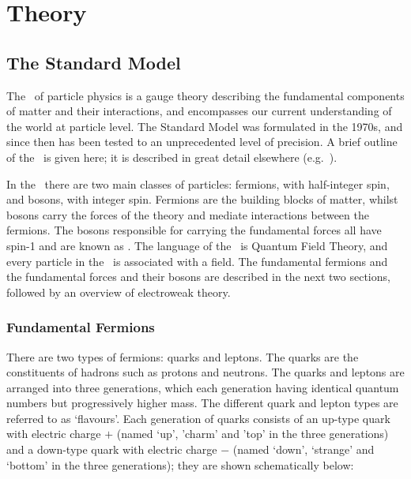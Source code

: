 \graphicspath{{Chapters/Theory/Figures/}}
\chapter{Theory}
\label{chap:Theory}

\section{The Standard Model}

The \sm\ of particle physics is a gauge theory describing the
fundamental components of matter and their interactions, and encompasses our
current understanding of the world at particle level. The Standard Model was
formulated in the 1970s, and since then has been tested to an unprecedented
level of precision. %
A brief outline of the \sm\ is given here; it is described in great detail
elsewhere (e.g.~\cite{ALTARELLI:2005zv}).

In the \sm\ there are two main classes of particles: fermions, with half-integer
spin, and bosons, with integer spin. Fermions are the building blocks of matter,
whilst bosons carry the forces of the theory and mediate interactions between the
fermions. The bosons responsible for carrying the fundamental forces all have
spin-1 and are known as .
The language of the \sm\ is Quantum Field Theory, and every particle in the \sm\
is associated with a field. The fundamental fermions and the fundamental forces
and their bosons are described in the next two sections, followed by an overview
of electroweak theory.

\subsection{Fundamental Fermions}

There are two types of fermions: quarks and leptons. The quarks are the
constituents of hadrons such as protons and neutrons. 
The quarks and leptons are arranged into three generations, which each
generation having identical quantum numbers but progressively higher mass. The
different quark and lepton types are referred to as `flavours'. Each
generation of quarks consists of an up-type quark with electric charge
$+$\nicefrac{2}{3}
(named `up', 'charm' and 'top' in the three generations) and a down-type quark
with electric charge $-$\nicefrac{1}{3} (named `down', `strange' and `bottom' in the three
generations); they are shown schematically below:


